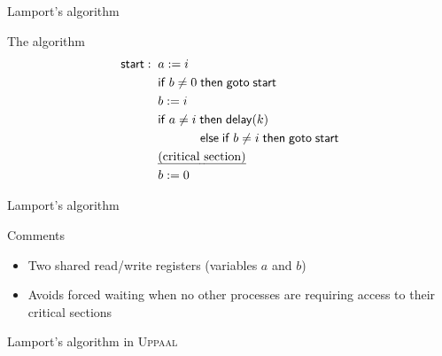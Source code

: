 \documentclass[aspectratio=169]{beamer}
\begin{document}
\begin{slide}{Lamport's algorithm}
\small

\begin{block}{The algorithm}
\begin{align*}
\mathsf{start}: \; \;  &  a := i\\
& \mathsf{if}\; b \neq 0\; \mathsf{then\; goto\; start}\\
& b := i \\
& \mathsf{if}\; a \neq i\; \mathsf{then\; delay}(k)\\
& \hspace{12mm} \mathsf{else} \; \mathsf{if}\; b \neq i\; \mathsf{then\; goto\; start}\\
& \text{\emph{(critical section)}}\\
& b := 0
\end{align*}
\end{block}
\end{slide}

\begin{slide}{Lamport's algorithm}
\small
\begin{block}{Comments}
\begin{itemize}
\item Two shared read/write registers (variables $a$ and $b$)
\item Avoids \alert{forced waiting} when no other processes are requiring access to their critical sections
\end{itemize}
\end{block}
\end{slide}


\begin{slide}{Lamport's algorithm in \textsc{Uppaal}}
\small
\centering


~\\[-6mm]

\hspace*{-130mm}%

\end{slide}
\end{document}
